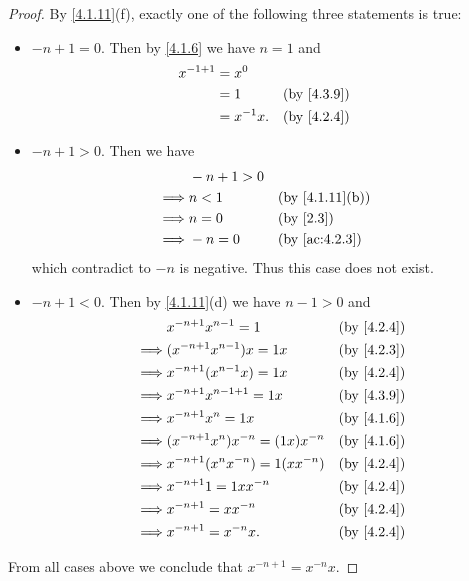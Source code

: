 \begin{proof}
  By \cref{4.1.11}(f), exactly one of the following three statements is true:
  \begin{itemize}
    \item \(-n + 1 = 0\).
          Then by \cref{4.1.6} we have \(n = 1\) and
          \begin{align*}
            x^{-1 + 1} & = x^0                       \\
                       & = 1         &  & \by{4.3.9} \\
                       & = x^{-1} x. &  & \by{4.2.4}
          \end{align*}
    \item \(-n + 1 > 0\).
          Then we have
          \begin{align*}
                     & -n + 1 > 0                                   \\
            \implies & n < 1      &  & \text{(by \cref{4.1.11}(b))} \\
            \implies & n = 0      &  & \text{(by \cref{2.3})}       \\
            \implies & -n = 0     &  & \text{(by \cref{ac:4.2.3})}
          \end{align*}
          which contradict to \(-n\) is negative.
          Thus this case does not exist.
    \item \(-n + 1 < 0\).
          Then by \cref{4.1.11}(d) we have \(n - 1 > 0\) and
          \begin{align*}
                     & x^{-n + 1} x^{n - 1} = 1              &  & \by{4.2.4} \\
            \implies & (x^{-n + 1} x^{n - 1}) x = 1x         &  & \by{4.2.3} \\
            \implies & x^{-n + 1} (x^{n - 1} x) = 1x         &  & \by{4.2.4} \\
            \implies & x^{-n + 1} x^{n - 1 + 1} = 1x         &  & \by{4.3.9} \\
            \implies & x^{-n + 1} x^n = 1x                   &  & \by{4.1.6} \\
            \implies & (x^{-n + 1} x^n) x^{-n} = (1x) x^{-n} &  & \by{4.1.6} \\
            \implies & x^{-n + 1} (x^n x^{-n}) = 1(x x^{-n}) &  & \by{4.2.4} \\
            \implies & x^{-n + 1} 1 = 1x x^{-n}              &  & \by{4.2.4} \\
            \implies & x^{-n + 1} = x x^{-n}                 &  & \by{4.2.4} \\
            \implies & x^{-n + 1} = x^{-n} x.                &  & \by{4.2.4}
          \end{align*}
  \end{itemize}
  From all cases above we conclude that \(x^{-n + 1} = x^{-n} x\).
\end{proof}

